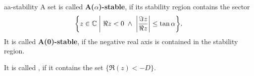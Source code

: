 \begin{Definition}{aa-stability}
  A set is called \textbf{A($\alpha$)-stable}, if its stability region
  contains the sector
  \begin{gather*}
    \bigg\{z\in \mathbb C\;\bigg|\; \Re z < 0 \;\wedge\; \left|\frac{\Im
        z}{\Re z}\right| \le \tan \alpha\biggr\}.
  \end{gather*}
  It is called \textbf{A(0)-stable}, if the negative real axis is contained in
  the stability region.

  It is called , if it contains the set
  $\{\Re(z)< -D\}$.
\end{Definition}

